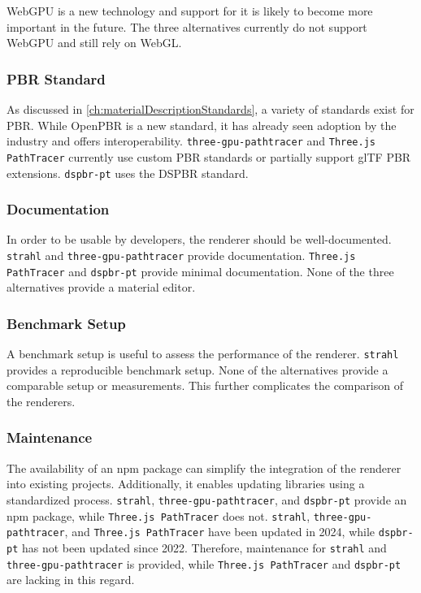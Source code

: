 \gls{WebGPU} is a new technology and support for it is likely to become more important in the future. The three alternatives currently do not support \gls{WebGPU} and still rely on \gls{WebGL}.

\subsubsection*{PBR Standard}

As discussed in \autoref{ch:materialDescriptionStandards}, a variety of standards exist for \gls{PBR}. While \gls{OpenPBR} is a new standard, it has already seen adoption by the industry and offers interoperability. \texttt{three-gpu-pathtracer} and \texttt{Three.js PathTracer} currently use custom \gls{PBR} standards or partially support \gls{glTF} \gls{PBR} extensions. \texttt{dspbr-pt} uses the \gls{DSPBR} standard.

\subsubsection*{Documentation}

In order to be usable by developers, the renderer should be well-documented. \texttt{strahl} and \texttt{three-gpu-pathtracer} provide documentation. \texttt{Three.js PathTracer} and \texttt{dspbr-pt} provide minimal documentation. None of the three alternatives provide a material editor.

\subsubsection*{Benchmark Setup}

A benchmark setup is useful to assess the performance of the renderer. \texttt{strahl} provides a reproducible benchmark setup. None of the alternatives provide a comparable setup or measurements. This further complicates the comparison of the renderers.

\subsubsection*{Maintenance}

The availability of an \gls{npm} package can simplify the integration of the renderer into existing projects. Additionally, it enables updating libraries using a standardized process. \texttt{strahl}, \texttt{three-gpu-pathtracer}, and \texttt{dspbr-pt} provide an \gls{npm} package, while \texttt{Three.js PathTracer} does not. \texttt{strahl}, \texttt{three-gpu-pathtracer}, and \texttt{Three.js PathTracer} have been updated in 2024, while \texttt{dspbr-pt} has not been updated since 2022. Therefore, maintenance for \texttt{strahl} and \texttt{three-gpu-pathtracer} is provided, while \texttt{Three.js PathTracer} and \texttt{dspbr-pt} are lacking in this regard.


